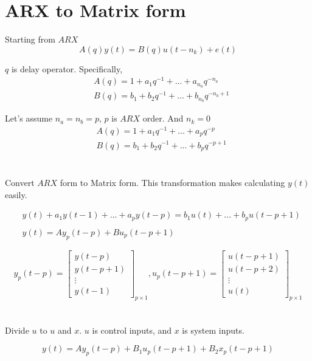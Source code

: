 \documentclass{article}
\begin{document}
\section{ARX to Matrix form}
Starting from $ARX$
\begin{equation*}
  A(q)y(t) = B(q)u(t-n_k) +e(t)
\end{equation*}

$q$ is delay operator. Specifically,
\begin{align*}
&A(q) = 1 + a_1q^{-1} + ... + a_{n_a}q^{-n_a}\\
&B(q) = b_1 + b_2q^{-1} + ... + b_{n_b}q^{-n_b+1}
\end{align*}

Let's assume $n_a = n_b = p$, $p$ is $ARX$ order. And $n_k = 0$
\begin{align*}
&A(q) = 1 + a_1q^{-1} + ... + a_{p}q^{-p}\\
&B(q) = b_1 + b_2q^{-1} + ... + b_{p}q^{-p+1}
\end{align*}
\\
\\

Convert $ARX$ form to Matrix form.
This transformation makes calculating $y(t)$ easily.

\begin{align*}
	&y(t) + a_1y(t-1) + ... + a_{p}y(t-p) = b_1u(t) + ... + b_{p}u(t-p+1)\\\\
	&y(t) = Ay_p(t-p) + Bu_p(t-p+1)
\end{align*}

\begin{equation*}
	y_p(t-p) =
	\begin{bmatrix}
		y(t-p)\\
		y(t-p+1)\\
		\vdots\\
		y(t-1)
	\end{bmatrix}_{p\times1}
	,u_p(t-p+1) = 
	\begin{bmatrix}
		u(t-p+1)\\
		u(t-p+2)\\
		\vdots\\
		u(t)
	\end{bmatrix}_{p\times1}
\end{equation*}
\\
\\
Divide $u$ to $u$ and $x$. $u$ is control inputs, and $x$ is system inputs.

\begin{equation}\label{eq:1}
	y(t) = Ay_p(t-p) + B_{1}u_p(t-p+1) + B_{2}x_p(t-p+1)
\end{equation}
\\
\\
\end{document}
